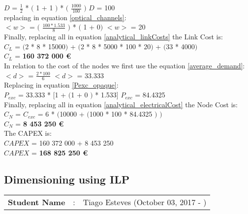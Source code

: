 $D$ = $\frac{1}{2}$ * $($ 1 + 1 $)$ * $($ $\frac{1000}{100}$ $)$ \qquad \qquad $D$ = 100\\

replacing in equation \ref{optical_channels}:\\

$<w>$ = $($ $\frac{100 * 1.533}{8}$ $)$ * $($ 1 + 0$)$ \qquad \quad $<w>$ = 20\\

Finally, replacing all in equation \ref{analytical_linkCosts} the Link Cost is:\\

$C_L$ = $($2 * 8 * 15000$)$ + $($2 * 8 * 5000 * 100 * 20$)$ + $($33 * 4000$)$\\

$C_L$ = \textbf{160 372 000 \euro}\\

In relation to the cost of the nodes we first use the equation \ref{average_demand}:\\

$<d>$ = $\frac{2 * 100}{6}$ \qquad \qquad $<d>$ = 33.333\\

Replacing in equation \ref{Pexc_opaque}:\\

$P_{exc}$ = 33.333 * $[$1 + $($1 + $0$ $)$ * 1.533$]$ \qquad \qquad $P_{exc}$ = 84.4325 \\

Finally, replacing all in equation \ref{analytical_electricalCost} the Node Cost is:\\

$C_N$ = $C_{exc}$ = 6 * $($10000 + $($1000 * 100 * 84.4325 $)$ $)$\\

$C_N$ = \textbf{8 453 250 \euro}\\

The CAPEX is:\\
$CAPEX$ = 160 372 000 + 8 453 250\\

$CAPEX$ = \textbf{168 825 250 \euro}\\


\subsection{Dimensioning using ILP}
\begin{tcolorbox}	
\begin{tabular}{p{2.75cm} p{0.2cm} p{10.5cm}} 	
\textbf{Student Name}  &:& Tiago Esteves    (October 03, 2017 - )\\
\end{tabular}
\end{tcolorbox}

